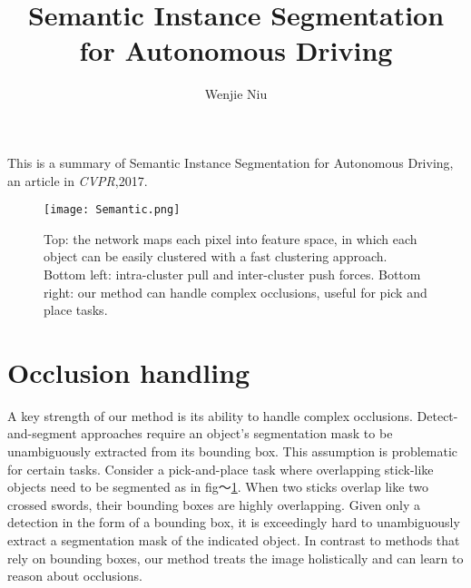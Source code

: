 \documentclass{article}
\author{Wenjie Niu}
\title{Semantic Instance Segmentation for Autonomous Driving}
\begin{document}
 
\twocolumn
\maketitle
This is a summary of Semantic Instance Segmentation for Autonomous Driving, an article in \emph{CVPR},2017\cite{Brabandere_2017_CVPR_Workshops}.
\begin{figure}[H]
\centering
 \texttt{[image: Semantic.png]} 
 \caption{Top: the network maps each pixel into feature space, in
which each object can be easily clustered with a fast clustering
approach. Bottom left: intra-cluster pull and inter-cluster push
forces. Bottom right: our method can handle complex occlusions,
useful for pick and place tasks.}  
 \label{fig:Semantic}
 \end{figure}
\section{Occlusion handling}
A key strength of our method is its ability to handle complex occlusions. Detect-and-segment approaches require an object’s segmentation mask to be unambiguously extracted from its bounding box. This assumption is problematic for certain tasks. Consider
a pick-and-place task where overlapping stick-like objects
need to be segmented as in fig～\ref{fig:Semantic}. When two sticks overlap like two crossed swords, their bounding boxes are highly overlapping. Given only a detection in the form of a bounding box, it is exceedingly hard to unambiguously extract a segmentation mask of the indicated object. In contrast to methods that rely on bounding boxes, our method treats the image holistically and can learn to reason about occlusions.\par
\end{document}
